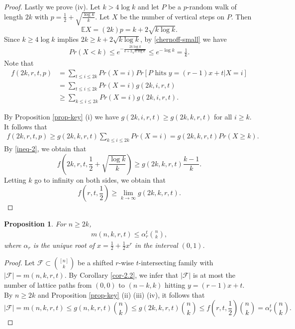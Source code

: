 \documentclass[11pt,a4paper]{article}
\newtheorem{prop}[thm]{Proposition}
\newtheorem{false statement}{False statement}
\theoremstyle{definition}
\newcommand{\ex}{{\rm ex}}
\def\hf{\mathcal{F}}
\def\ex{\mathbb{E}}
\begin{document}
\begin{proof}
Lastly we prove (iv). Let $k>  4\log k$ and let $P$ be a $p$-random walk of length $2k$ with $p=\frac{1}{2}+\sqrt{\frac{\log k}{k}}$.  Let $X$ be the number of vertical steps on $P$. Then
 \[
 \ex X=(2k)p =k+2\sqrt{k\log k}.
 \]
 Since $k\geq 4\log k$ implies $2k\geq k+2\sqrt{k\log k}$, by \eqref{chernoff-small} we have
\begin{align}\label{ineq-2}
Pr(X< k) \leq e^{-\frac{2k\log k}{k+2\sqrt{k\log k}}} \leq e^{-\log k} = \frac{1}{k}.
\end{align}
Note that
\begin{align*}
f(2k,r,t,p)&=\sum_{t\leq i\leq 2k} Pr(X=i) Pr[P\mbox{ hits } y=(r-1)x+t|X=i]\\[3pt]
& = \sum_{t\leq i\leq 2k} Pr(X=i) g(2k,i,r,t)\\[3pt]
& \geq \sum_{k\leq i\leq 2k} Pr(X=i) g(2k,i,r,t).
\end{align*}

By Proposition \ref{prop-key} (i) we have $g(2k,i,r,t)\geq g(2k,k,r,t)$ for all $i\geq k$. It follows that
\begin{align*}
f(2k,r,t,p)\geq g(2k,k,r,t)\sum_{k\leq i\leq 2k} Pr(X=i) = g(2k,k,r,t) Pr(X\geq k).
\end{align*}
By  \eqref{ineq-2}, we obtain that
\[
f\left(2k,r,t,\frac{1}{2}+\sqrt{\frac{\log k}{k}}\right) \geq g(2k,k,r,t) \frac{k-1}{k}.
\]
Letting $k$ go to infinity on both sides, we obtain that
\[
f\left(r,t,\frac{1}{2}\right)\geq \lim\limits_{k\rightarrow \infty} g(2k,k,r,t).
\]
\end{proof}




\begin{prop}\label{prop-key3}
For $n\geq 2k$,
\begin{align}\label{ineq-key3}
m(n,k,r,t)\leq \alpha_r^t \binom{n}{k},
\end{align}
where $\alpha_r$ is the unique root of  $x = \frac{1}{2}+ \frac{1}{2}x^{r}$ in the interval $(0,1)$.
\end{prop}
\begin{proof}
Let $\hf\subset \binom{[n]}{k}$ be a shifted $r$-wise $t$-intersecting family with $|\hf|=m(n,k,r,t)$. By Corollary \ref{cor-2.2}, we infer that $|\hf|$ is at most  the number of lattice paths from $(0,0)$ to $(n-k,k)$ hitting $y=(r-1)x+t$. By $n\geq 2k$ and Proposition \ref{prop-key} (ii) (iii) (iv), it follows that
\[
|\hf|=m(n,k,r,t) \leq g(n,k,r,t)\binom{n}{k} \leq g(2k,k,r,t)\binom{n}{k} \leq f\left(r,t,\frac{1}{2}\right)\binom{n}{k} =\alpha_r^t\binom{n}{k}.
\]
\end{proof}
\end{document}
